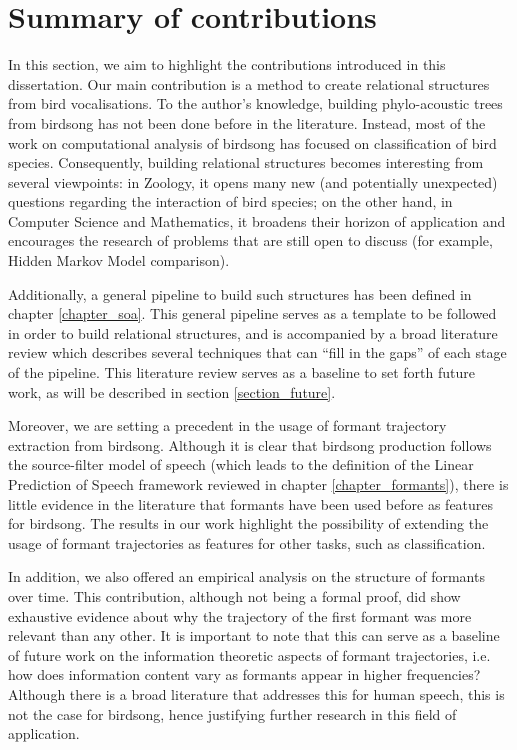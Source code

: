 \documentclass[../main.tex]{subfiles}
\begin{document}
\section{Summary of contributions}
In this section, we aim to highlight the contributions introduced in this dissertation. Our main contribution is a method to create relational structures from bird vocalisations. To the author's knowledge, building phylo-acoustic trees from birdsong has not been done before in the literature. Instead, most of the work on computational analysis of birdsong has focused on classification of bird species. Consequently, building relational structures becomes interesting from several viewpoints: in Zoology, it opens many new (and potentially unexpected) questions regarding the interaction of bird species; on the other hand, in Computer Science and Mathematics, it broadens their horizon of application and encourages the research of problems that are still open to discuss (for example, Hidden Markov Model comparison).
\par Additionally, a general pipeline to build such structures has been defined in chapter \ref{chapter_soa}. This general pipeline serves as a template to be followed in order to build relational structures, and is accompanied by a broad literature review which describes several techniques that can ``fill in the gaps'' of each stage of the pipeline. This literature review serves as a baseline to set forth future work, as will be described in section \ref{section_future}.
\par Moreover, we are setting a precedent in the usage of formant trajectory extraction from birdsong. Although it is clear that birdsong production follows the source-filter model of speech (which leads to the definition of the Linear Prediction of Speech framework reviewed in chapter \ref{chapter_formants}), there is little evidence in the literature that formants have been used before as features for birdsong. The results in our work highlight the possibility of extending the usage of formant trajectories as features for other tasks, such as classification. 
\par In addition, we also offered an empirical analysis on the structure of formants over time. This contribution, although not being a formal proof, did show exhaustive evidence about why the trajectory of the first formant was more relevant than any other. It is important to note that this can serve as a baseline of future work on the information theoretic aspects of formant trajectories, i.e. how does information content vary as formants appear in higher frequencies? Although there is a broad literature that addresses this for human speech, this is not the case for birdsong, hence justifying further research in this field of application.
\end{document}
